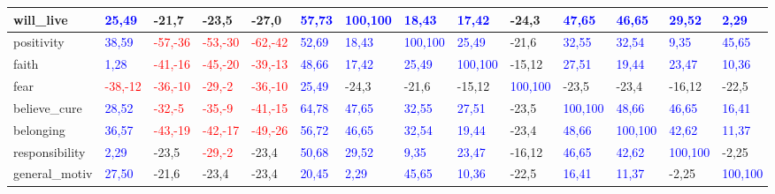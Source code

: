 \begin{table}[H]
\begin{adjustbox}{angle=90}
\begin{tabular} {|l|l|l|l|l|l|l|l|l|l|l|l|l|l|}
 \hline 
 will\_live & {\textcolor{blue}{25,49}} & -21,7 & -23,5 & -27,0 & {\textcolor{blue}{57,73}} & {\textcolor{blue}{100,100}} & {\textcolor{blue}{18,43}} & {\textcolor{blue}{17,42}} & -24,3 & {\textcolor{blue}{47,65}} & {\textcolor{blue}{46,65}} & {\textcolor{blue}{29,52}} & {\textcolor{blue}{2,29}} \\ 
 \hline 
 positivity & {\textcolor{blue}{38,59}} & {\textcolor{red}{-57,-36}} & {\textcolor{red}{-53,-30}} & {\textcolor{red}{-62,-42}} & {\textcolor{blue}{52,69}} & {\textcolor{blue}{18,43}} & {\textcolor{blue}{100,100}} & {\textcolor{blue}{25,49}} & -21,6 & {\textcolor{blue}{32,55}} & {\textcolor{blue}{32,54}} & {\textcolor{blue}{9,35}} & {\textcolor{blue}{45,65}} \\ 
 \hline 
 faith & {\textcolor{blue}{1,28}} & {\textcolor{red}{-41,-16}} & {\textcolor{red}{-45,-20}} & {\textcolor{red}{-39,-13}} & {\textcolor{blue}{48,66}} & {\textcolor{blue}{17,42}} & {\textcolor{blue}{25,49}} & {\textcolor{blue}{100,100}} & -15,12 & {\textcolor{blue}{27,51}} & {\textcolor{blue}{19,44}} & {\textcolor{blue}{23,47}} & {\textcolor{blue}{10,36}} \\ 
 \hline 
 fear & {\textcolor{red}{-38,-12}} & {\textcolor{red}{-36,-10}} & {\textcolor{red}{-29,-2}} & {\textcolor{red}{-36,-10}} & {\textcolor{blue}{25,49}} & -24,3 & -21,6 & -15,12 & {\textcolor{blue}{100,100}} & -23,5 & -23,4 & -16,12 & -22,5 \\ 
 \hline 
 believe\_cure & {\textcolor{blue}{28,52}} & {\textcolor{red}{-32,-5}} & {\textcolor{red}{-35,-9}} & {\textcolor{red}{-41,-15}} & {\textcolor{blue}{64,78}} & {\textcolor{blue}{47,65}} & {\textcolor{blue}{32,55}} & {\textcolor{blue}{27,51}} & -23,5 & {\textcolor{blue}{100,100}} & {\textcolor{blue}{48,66}} & {\textcolor{blue}{46,65}} & {\textcolor{blue}{16,41}} \\ 
 \hline 
 belonging & {\textcolor{blue}{36,57}} & {\textcolor{red}{-43,-19}} & {\textcolor{red}{-42,-17}} & {\textcolor{red}{-49,-26}} & {\textcolor{blue}{56,72}} & {\textcolor{blue}{46,65}} & {\textcolor{blue}{32,54}} & {\textcolor{blue}{19,44}} & -23,4 & {\textcolor{blue}{48,66}} & {\textcolor{blue}{100,100}} & {\textcolor{blue}{42,62}} & {\textcolor{blue}{11,37}} \\ 
 \hline 
 responsibility & {\textcolor{blue}{2,29}} & -23,5 & {\textcolor{red}{-29,-2}} & -23,4 & {\textcolor{blue}{50,68}} & {\textcolor{blue}{29,52}} & {\textcolor{blue}{9,35}} & {\textcolor{blue}{23,47}} & -16,12 & {\textcolor{blue}{46,65}} & {\textcolor{blue}{42,62}} & {\textcolor{blue}{100,100}} & -2,25 \\ 
 \hline 
 general\_motiv & {\textcolor{blue}{27,50}} & -21,6 & -23,4 & -23,4 & {\textcolor{blue}{20,45}} & {\textcolor{blue}{2,29}} & {\textcolor{blue}{45,65}} & {\textcolor{blue}{10,36}} & -22,5 & {\textcolor{blue}{16,41}} & {\textcolor{blue}{11,37}} & -2,25 & {\textcolor{blue}{100,100}} \\ 
 \hline 
 \hline 
 \end{tabular} 
\end{adjustbox}  
\end{table} 
